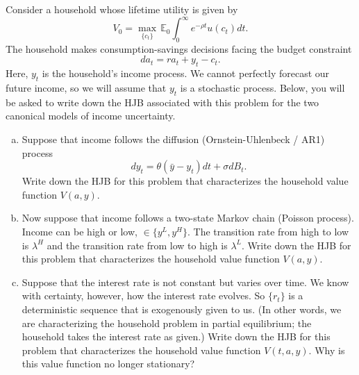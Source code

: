 \documentclass[11pt]{extarticle}
\theoremstyle{plain}
\theoremstyle{definition}
\begin{document}
Consider a household whose lifetime utility is given by 
\begin{equation*}
	V_0 = \max_{ \{c_t\} } \, \mathbb E_0 \int_0^\infty e^{- \rho t} u(c_t) dt.
\end{equation*}
The household makes consumption-savings decisions facing the budget constraint 
\begin{equation*}
	da_t = r a_t + y_t - c_t.
\end{equation*}
Here, $y_t$ is the household's income process. We cannot perfectly forecast our future income, so we will assume that $y_t$ is a stochastic process. Below, you will be asked to write down the HJB associated with this problem for the two canonical models of income uncertainty.

\vspace{4mm}
\begin{enumerate}[(a)]
\item Suppose that income follows the diffusion (Ornstein-Uhlenbeck / AR1) process
\begin{equation*}
	dy_t = \theta(\bar y - y_t) dt + \sigma dB_t.
\end{equation*}
Write down the HJB for this problem that characterizes the household value function $V(a, y)$. 

\item Now suppose that income follows a two-state Markov chain (Poisson process). Income can be high or low, $\in \{y^L, y^H\}$. The transition rate from high to low is $\lambda^H$ and the transition rate from low to high is $\lambda^L$. Write down the HJB for this problem that characterizes the household value function $V(a, y)$. 

\item Suppose that the interest rate is not constant but varies over time. We know with certainty, however, how the interest rate evolves. So $\{r_t\}$ is a deterministic sequence that is exogenously given to us. (In other words, we are characterizing the household problem in partial equilibrium; the household takes the interest rate as given.) Write down the HJB for this problem that characterizes the household value function $V(t, a, y)$. Why is this value function no longer stationary?

\end{enumerate}
\end{document}
